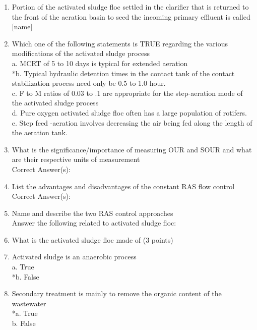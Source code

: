 \begin{enumerate}
\item Portion of the activated sludge floc settled in the clarifier that is returned to the front of the aeration basin to seed the incoming primary effluent is called [name]\\

\item Which one of the following statements is TRUE regarding the various modifications of the activated sludge process\\
a. MCRT of 5 to 10 days is typical for extended aeration \\
*b. Typical hydraulic detention times in the contact tank of the contact stabilization process need only be 0.5 to 1.0 hour. \\
c. F to M ratios of 0.03 to .1 are appropriate for the step-aeration mode of the activated sludge process \\
d. Pure oxygen activated sludge floc often has a large population of rotifers. \\
e. Step feed -aeration involves decreasing the air being fed along the length of the aeration tank. \\

\item What is the significance/importance of measuring OUR and SOUR and what are their respective units of measurement\\
Correct Answer(s): \\

\item List the advantages and disadvantages of the constant RAS flow control \\
Correct Answer(s): \\

\item Name and describe the two RAS control approaches \\

Answer the following related to activated sludge floc:\\

\item What is the activated sludge floc made of (3 points)\\

\item Activated sludge is an anaerobic process \\
a. True \\
*b. False \\

\item  Secondary treatment is mainly to remove the organic content of the wastewater \\
*a. True \\
b. False \\


\end{enumerate}
